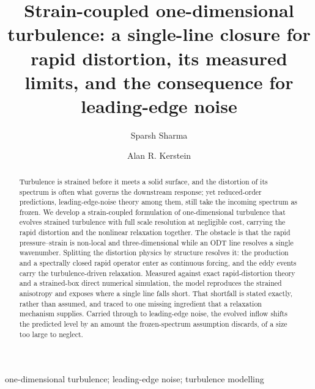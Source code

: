 \documentclass[lineno]{JFM-FLM_Au}
\title{Strain-coupled one-dimensional turbulence: a single-line closure for rapid distortion, its measured limits, and the consequence for leading-edge noise}
\author{Sparsh Sharma\aff{1} \and Alan R. Kerstein\aff{2}}
\affiliation{
\aff{1}German Aerospace Center (DLR), 38108 Braunschweig, Germany
\aff{2}Consultant, Danville, CA 94526, USA
}
\begin{document}
\maketitle

\begin{abstract}
Turbulence is strained before it meets a solid surface, and the
distortion of its spectrum is often what governs the downstream
response; yet reduced-order predictions, leading-edge-noise theory among
them, still take the incoming spectrum as frozen. We develop a
strain-coupled formulation of one-dimensional turbulence that evolves
strained turbulence with full scale resolution at negligible cost,
carrying the rapid distortion and the nonlinear relaxation together. The
obstacle is that the rapid pressure--strain is non-local and
three-dimensional while an ODT line resolves a single wavenumber.
Splitting the distortion physics by structure resolves it: the
production and a spectrally closed rapid operator enter as continuous
forcing, and the eddy events carry the turbulence-driven relaxation.
Measured against exact rapid-distortion theory and a strained-box direct
numerical simulation, the model reproduces the strained anisotropy and
exposes where a single line falls short. That shortfall is stated
exactly, rather than assumed, and traced to one missing ingredient that
a relaxation mechanism supplies. Carried through to leading-edge noise,
the evolved inflow shifts the predicted level by an amount the
frozen-spectrum assumption discards, of a size too large to neglect.
\end{abstract}

\begin{keywords}
one-dimensional turbulence; leading-edge noise; turbulence modelling
\end{keywords}
\end{document}
